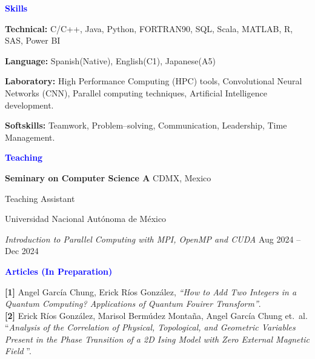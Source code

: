 \documentclass[10pt]{article}
\begin{document}
\vspace{12pt}

\vspace{12pt}
\begin{center}
    \textbf{\textcolor{blue}{Skills}}
\end{center}
\vspace{12pt}
\textbf{Technical:} C/C++, Java, Python, FORTRAN90, SQL, Scala, MATLAB, R, SAS, Power BI

\textbf{Language:} Spanish(Native), English(C1), Japanese(A5)

\textbf{Laboratory:} High Performance Computing (HPC) tools, Convolutional Neural Networks (CNN), Parallel computing techniques, Artificial Intelligence development.

\textbf{Softskills:} Teamwork, Problem–solving, Communication, Leadership, Time Management.

\vspace{12pt}
\begin{center}
    \textbf{\textcolor{blue}{Teaching}}
\end{center}
\vspace{12pt}

\textbf{Seminary on Computer Science A} \hfill CDMX, Mexico

Teaching Assistant

Universidad Nacional Autónoma de México 

\textit{Introduction to Parallel Computing with MPI, OpenMP and CUDA} \hfill Aug 2024 – Dec 2024

\vspace{12pt}
\begin{center}
    \textbf{\textcolor{blue}{Articles (In Preparation)}}
\end{center}
\vspace{12pt}

\textbf{[1]} Angel García Chung, Erick Ríos González, \textit{“How to Add Two Integers in a Quantum Computing? Applications of Quantum Fouirer Transform”}. \\
\textbf{[2]} Erick Ríos González, Marisol Bermúdez Montaña, Angel García Chung et.\ al. ``\textit{Analysis of the Correlation of Physical, Topological, and Geometric Variables Present in the Phase Transition of a 2D Ising Model with Zero External Magnetic Field}
''. \\
\end{document}

